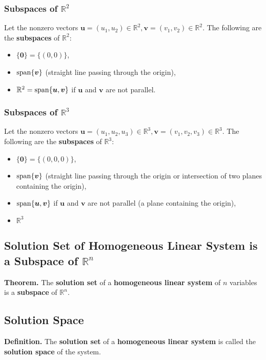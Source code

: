 \documentclass[../ma2001_notes.tex]{subfiles}
\begin{document}
\subsubsection{Subspaces of $\mathbb{R}^2$}
Let the nonzero vectors \(\bm{u}=(u_1,u_2)\in\mathbb{R}^2,\bm{v}=(v_1,v_2)\in\mathbb{R}^2\). The following are the \textbf{subspaces} of \(\mathbb{R}^2\):
\begin{itemize}
	\item\(\{\bm{0}\}=\{(0,0)\}\),
	\item\(\operatorname{span}\{\bm{v}\}\) (straight line passing through the origin),
	\item\(\mathbb{R}^2=\operatorname{span}\{\bm{u},\bm{v}\}\) if \(\bm{u}\) and \(\bm{v}\) are not parallel.
\end{itemize}

\subsubsection{Subspaces of $\mathbb{R}^3$}
Let the nonzero vectors \(\bm{u}=(u_1,u_2,u_3)\in\mathbb{R}^3,\bm{v}=(v_1,v_2,v_3)\in\mathbb{R}^3\). The following are the \textbf{subspaces} of \(\mathbb{R}^3\):
\begin{itemize}
	\item\(\{\bm{0}\}=\{(0,0,0)\}\),
	\item\(\operatorname{span}\{\bm{v}\}\) (straight line passing through the origin or intersection of two planes containing the origin),
	\item\(\operatorname{span}\{\bm{u},\bm{v}\}\) if \(\bm{u}\) and \(\bm{v}\) are not parallel (a plane containing the origin),
	\item\(\mathbb{R}^3\)
\end{itemize}

\subsection{Solution Set of Homogeneous Linear System is a Subspace of $\mathbb{R}^n$}
\textbf{Theorem.} The \textbf{solution set} of a \textbf{homogeneous linear system} of \(n\) variables is a \textbf{subspace} of \(\mathbb{R}^n\).

\subsection{Solution Space}
\textbf{Definition.} The \textbf{solution set} of a \textbf{homogeneous linear system} is called the \textbf{solution space} of the system.
\end{document}

